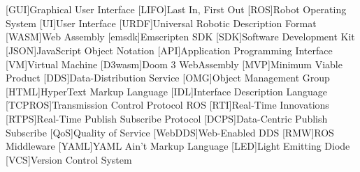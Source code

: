 \chapter*{}



\section*{}
\begin{acronym}[LONGEST]

    [GUI]{Graphical User Interface}
    [LIFO]{Last In, First Out}
    [ROS]{Robot Operating System}
    [UI]{User Interface}
    [URDF]{Universal Robotic Description Format}
    [WASM]{Web Assembly}
    [emsdk]{Emscripten SDK}
    [SDK]{Software Development Kit}
    [JSON]{JavaScript Object Notation}
    [API]{Application Programming Interface}
    [VM]{Virtual Machine}
    [D3wasm]{Doom 3 WebAssembly}
    [MVP]{Minimum Viable Product}
    [DDS]{Data-Distribution Service}
    [OMG]{Object Management Group}
    [HTML]{HyperText Markup Language}
    [IDL]{Interface Description Language}
    [TCPROS]{Transmission Control Protocol ROS}
    [RTI]{Real-Time Innovations}
    [RTPS]{Real-Time Publish Subscribe Protocol}
    [DCPS]{Data-Centric Publish Subscribe}
    [QoS]{Quality of Service}
    [WebDDS]{Web-Enabled DDS}
    [RMW]{ROS Middleware}
    [YAML]{YAML Ain't Markup Language}
    [LED]{Light Emitting Diode}
    [VCS]{Version Control System}

\end{acronym}

